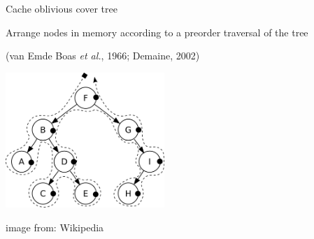 \begin{frame}[fragile]{Cache oblivious cover tree}

Arrange nodes in memory according to a preorder traversal of the tree

(van Emde Boas \emph{et al.}, 1966; Demaine, 2002)
\vspace{0.1in}

\begin{center}
\includegraphics[width=6cm]{slides/preorder.png}
\end{center}

{\tiny image from: Wikipedia}
%
%


\end{frame}


